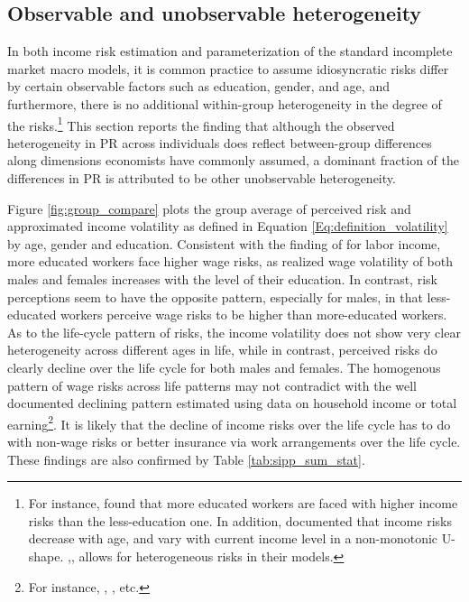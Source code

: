 
\hypertarget{cross-sectional-heterogeneity}{%
\subsection{Observable and unobservable
heterogeneity}\label{cross-sectional-heterogeneity}}


In both income risk estimation and parameterization of the standard incomplete market macro models, it is common practice to assume idiosyncratic risks differ by certain observable factors such as education, gender, and age, and furthermore, there is no additional within-group heterogeneity in the degree of the risks.\footnote{For instance, \cite{meghir2004income} found that more educated workers are faced with higher income risks than the less-education one. In addition, \cite{sabelhaus2010great, bloom2018great} documented that income risks decrease with age, and vary with current income level in a non-monotonic U-shape. \cite{cagetti2003wealth},\cite{blundell_consumption_2008}, \cite{carroll2017distribution} allows for heterogeneous risks in their models.} This section reports the finding that although the observed heterogeneity in PR across individuals does reflect between-group differences along dimensions economists have commonly assumed, a dominant fraction of the differences in PR is attributed to be other unobservable heterogeneity. 

Figure
\ref{fig:group_compare} plots the group average of perceived risk and approximated income volatility as defined in Equation \ref{Eq:definition_volatility} by age, gender and education. Consistent with the finding of \cite{meghir2004income} for labor income, more educated workers face higher wage risks, as realized wage volatility of both males and females increases with the level of their education. In contrast, risk perceptions seem to have the opposite pattern, especially for males, in that less-educated workers perceive wage risks to be higher than more-educated workers. As to the life-cycle pattern of risks, the income volatility does not show very clear heterogeneity across different ages in life, while in contrast, perceived risks do clearly decline over the life cycle for both males and females. The homogenous pattern of wage risks across life patterns may not contradict with the well documented declining pattern estimated using data on household income or total earning\footnote{For instance, \cite{cagetti2003wealth}, \cite{sabelhaus2010great}, etc.}. It is likely that the decline of income risks over the life cycle has to do with non-wage risks or better insurance via work arrangements over the life cycle. These findings are also confirmed by Table \ref{tab:sipp_sum_stat}. 

